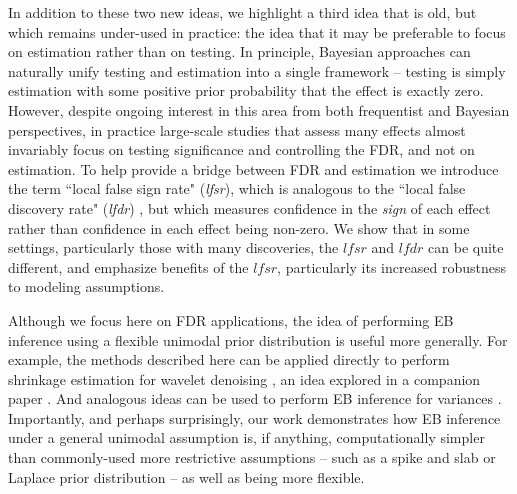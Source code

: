 \documentclass[11pt]{article}
\def\lfdr{\textit{lfdr}}
\def\lfsr{\textit{lfsr}}
\begin{document}
In addition to these two new ideas, we highlight a third idea that is old, but which remains under-used in practice:
the idea that it may be preferable to focus on estimation rather than on testing.
In principle, Bayesian approaches can naturally unify testing and estimation into a single framework -- testing is
simply estimation with some positive prior probability that the effect is exactly zero.
However, despite ongoing interest in this area from both frequentist \cite{benjamini2005false} and Bayesian \cite{zhao2012empirical,gelman2012we} 
perspectives, in practice large-scale studies that assess many effects almost invariably focus on testing significance and
controlling the FDR, and not on estimation. To help provide a bridge between FDR and estimation we introduce the term
``local false sign rate" (\lfsr), which is analogous to the ``local false discovery rate" (\lfdr) \cite{efron2008microarrays}, but which measures confidence  
in the {\it sign} of each effect rather than confidence in each effect being non-zero. We show that in some settings, particularly those with many discoveries, 
the $\lfsr$ and $\lfdr$ can be quite different, and emphasize benefits of the $\lfsr$, particularly its increased robustness to modeling assumptions. 



Although we focus here on FDR applications, the idea of performing EB inference using a flexible unimodal prior distribution
is useful more generally. For example, the methods described here can be applied directly to perform shrinkage estimation for
wavelet denoising \cite{donoho:1995}, an idea explored in a companion paper \cite{xing2016smoothing}. And analogous ideas can be used to perform
EB inference for variances \cite{lu2016variance}.
Importantly, and perhaps surprisingly, our work demonstrates how EB inference under a general unimodal assumption is, if anything, computationally simpler  
than commonly-used more restrictive assumptions -- such as a spike and slab or Laplace prior distribution \cite{johnstone2004needles} --  as well as being more flexible.
\end{document}
